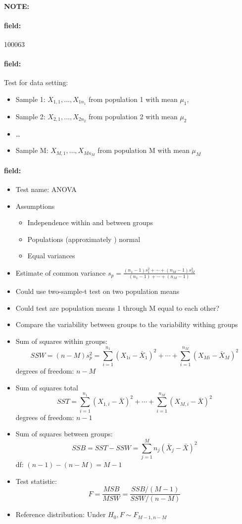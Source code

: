 \documentclass[12pt]{article}
\newenvironment{note}{\paragraph{NOTE:}}{}
\newenvironment{field}{\paragraph{field:}}{}
\begin{document}
\begin{note} \begin{field} \tiny 100063 \end{field}
 \begin{field}
  Test for data setting:
\begin{itemize}
  \item Sample 1: $X_{1,1}, \ldots , X_{1n_1}$ from population 1 with mean $\mu_1$,
  \item Sample 2: $X_{2,1}, \ldots , X_{2n_2}$ from population 2 with mean $\mu_2$
  \item \ldots
  \item Sample M: $X_{M,1}, \ldots , X_{Mn_M}$ from population M with mean $\mu_M$

\end{itemize}
 \end{field}
 \begin{field}
  \begin{itemize}
   \item Test name: ANOVA
   \item Assumptions
   \begin{itemize}
     \item Independence within and between groups
     \item Populations (approximately ) normal
     \item Equal variances
   \end{itemize}
   \item Estimate of common variance $s_p = \frac{(n_1-1)s_1^2 + \cdots + (n_M -1)s_M^2}{(n_1-1) + \cdots + (n_M-1)}$
   \item Could use two-sample-t test on two population means
   \item Could test are population means 1 through M equal to each other?
   \item Compare the variability between groups to the variability withing groups
   \item Sum of squares within groups:
         $$ SSW = (n-M)s_p^2  = \sum_{i=1}^{n_1}(X_{1i} - \bar{X}_1)^2 + \cdots +  \sum_{i=1}^{n_M}(X_{Mi} - \bar{X}_M)^2$$
         degrees of freedom: $n-M$
   \item Sum of squares total
         $$ SST  = \sum_{i=1}^{n_1}(X_{1,i} - \bar{X})^2 + \cdots + \sum_{i=1}^{n_M} (X_{M,i} - \bar{X})^2$$
         degrees of freedom: $n-1$
   \item Sum of squares between groups: $$ SSB = SST - SSW = \sum_{j=1}^Mn_j(\bar{X}_j - \bar{X})^2$$ df: $(n-1) - (n-M) = M-1$
   \item Test statistic: $$ F = \frac{MSB}{MSW} = \frac{SSB/(M-1)}{SSW/(n-M)} $$
   \item Reference distribution: Under $H_0, F \sim F_{M-1, n-M}$
  \end{itemize}
 \end{field}
\end{note}
\end{document}
